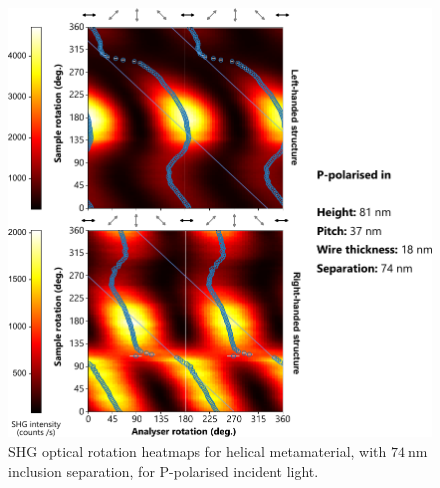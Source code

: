 \begin{figure}[htb!]	
    \centering	
    \includegraphics[scale=1]{./figures/results/OAinPlanarNanohelices/b_p_data.pdf}

    \caption{\label{fig:results:OAinPlanarNanohelices:b_p_data}
    SHG optical rotation heatmaps for helical metamaterial, with $\SI{74}{\nano\m}$ inclusion separation, for P-polarised incident light.}	
\end{figure}

